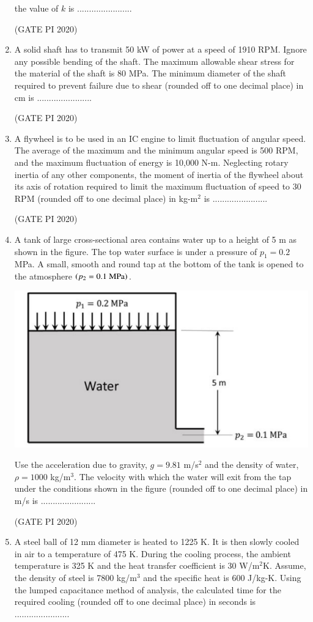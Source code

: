 \documentclass[journal,12pt,onecolumn]{IEEEtran}
\theoremstyle{remark}
\begin{document}
\begin{enumerate}
the value of $k$ is .......................

\hfill (GATE PI 2020)

\item A solid shaft has to transmit 50 kW of power at a speed of 1910 RPM. Ignore any possible bending of the shaft. The maximum allowable shear stress for the material of the shaft is 80 MPa. The minimum diameter of the shaft required to prevent failure due to shear (rounded off to one decimal place) in cm is .......................

\hfill (GATE PI 2020)

\item A flywheel is to be used in an IC engine to limit fluctuation of angular speed. The average of the maximum and the minimum angular speed is 500 RPM, and the maximum fluctuation of energy is 10,000 N\--m. Neglecting rotary inertia of any other components, the moment of inertia of the flywheel about its axis of rotation required to limit the maximum fluctuation of speed to 30 RPM (rounded off to one decimal place) in kg\--m$^2$ is .......................

\hfill (GATE PI 2020)

\item A tank of large cross-sectional area contains water up to a height of 5 m as shown in the figure. The top water surface is under a pressure of $p_1 = 0.2$ MPa. A small, smooth and round tap at the bottom of the tank is opened to the atmosphere $\left(p_2 = 0.1\text{ MPa}\right)$.\
\begin{center}
\includegraphics[width=0.5\columnwidth]{figs/fig14.png}
\end{center}
Use the acceleration due to gravity, $g = 9.81$ m/s$^2$ and the density of water, $\rho = 1000$ kg/m$^3$. The velocity with which the water will exit from the tap under the conditions shown in the figure (rounded off to one decimal place) in m/s is ....................... 

\hfill (GATE PI 2020)

\item A steel ball of 12 mm diameter is heated to 1225 K. It is then slowly cooled in air to a temperature of 475 K. During the cooling process, the ambient temperature is 325 K and the heat transfer coefficient is 30 W/m$^2$K. Assume, the density of steel is 7800 kg/m$^3$ and the specific heat is 600 J/kg-K. Using the lumped capacitance method of analysis, the calculated time for the required cooling (rounded off to one decimal place) in seconds is ....................... 


\end{enumerate}
\end{document}
